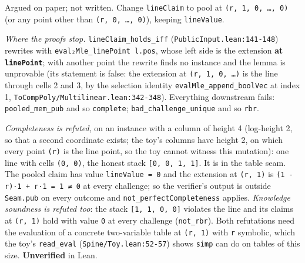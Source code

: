 Argued on paper; not written. Change \texttt{lineClaim} to pool at \texttt{(\allowbreak{}r,\allowbreak{} 1,\allowbreak{} 0,\allowbreak{} …,\allowbreak{} 0)} (or any point other than \texttt{(\allowbreak{}r,\allowbreak{} 0,\allowbreak{} …,\allowbreak{} 0)}), keeping \texttt{lineValue}.

\emph{Where the proofs stop.} \texttt{lineClaim\_\allowbreak{}holds\_\allowbreak{}iff} (\texttt{PublicInput.\allowbreak{}lean:141-{}148}) rewrites with \texttt{eval₂Mle\_\allowbreak{}linePoint l.\allowbreak{}pos}, whose left side is the extension \textbf{at \texttt{linePoint}}; with another point the rewrite finds no instance and the lemma is unprovable (its statement is false: the extension at \texttt{(\allowbreak{}r,\allowbreak{} 1,\allowbreak{} 0,\allowbreak{} …)} is the line through cells 2 and 3, by the selection identity \texttt{evalMle\_\allowbreak{}append\_\allowbreak{}boolVec} at index 1, \texttt{T\allowbreak{}o\allowbreak{}C\allowbreak{}o\allowbreak{}m\allowbreak{}p\allowbreak{}P\allowbreak{}o\allowbreak{}l\allowbreak{}y\allowbreak{}/\allowbreak{}M\allowbreak{}u\allowbreak{}l\allowbreak{}t\allowbreak{}i\allowbreak{}l\allowbreak{}i\allowbreak{}n\allowbreak{}e\allowbreak{}a\allowbreak{}r\allowbreak{}.\allowbreak{}l\allowbreak{}e\allowbreak{}a\allowbreak{}n\allowbreak{}:\allowbreak{}3\allowbreak{}4\allowbreak{}2\allowbreak{}-{}\allowbreak{}3\allowbreak{}4\allowbreak{}8}). Everything downstream fails: \texttt{pooled\_\allowbreak{}mem\_\allowbreak{}pub} and so \texttt{complete}; \texttt{bad\_\allowbreak{}challenge\_\allowbreak{}unique} and so \texttt{rbr}.

\emph{Completeness is refuted}, on an instance with a column of height 4 (log-height 2, so that a second coordinate exists; the toy's columns have height 2, on which every point \texttt{(\allowbreak{}r)} is the line point, so the toy cannot witness this mutation): one line with cells \texttt{(\allowbreak{}0,\allowbreak{} 0)}, the honest stack \texttt{[0,\allowbreak{} 0,\allowbreak{} 1,\allowbreak{} 1]}. It is in the table seam. The pooled claim has value \texttt{lineValue = 0} and the extension at \texttt{(\allowbreak{}r,\allowbreak{} 1)} is \texttt{(\allowbreak{}1 -{} r)·1 + r·1 = 1 ≠ 0} at every challenge; so the verifier's output is outside \texttt{Seam.\allowbreak{}pub} on every outcome and \texttt{not\_\allowbreak{}perfectCompleteness} applies. \emph{Knowledge soundness is refuted too}: the stack \texttt{[1,\allowbreak{} 1,\allowbreak{} 0,\allowbreak{} 0]} violates the line and its claims at \texttt{(\allowbreak{}r,\allowbreak{} 1)} hold with value \texttt{0} at every challenge (\texttt{not\_\allowbreak{}rbr}). Both refutations need the evaluation of a concrete two-variable table at \texttt{(\allowbreak{}r,\allowbreak{} 1)} with \texttt{r} symbolic, which the toy's \texttt{read\_\allowbreak{}eval} (\texttt{Spine/\allowbreak{}Toy.\allowbreak{}lean:52-{}57}) shows \texttt{simp} can do on tables of this size. \textbf{Unverified} in Lean.

